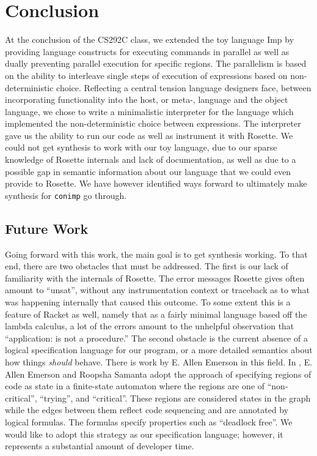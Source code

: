 \section{Conclusion}
At the conclusion of the CS292C class, we extended the toy language Imp by providing language constructs for executing commands in parallel as well as dually preventing parallel execution for specific regions.  The parallelism is based on the ability to interleave single steps of execution of expressions based on non-deterministic choice.  Reflecting a central tension language designers face, between incorporating functionality into the host, or meta-, language and the object language, we chose to write a minimalistic interpreter for the language which implemented the non-deterministic choice between expressions.  The interpreter gave us the ability to run our code as well as instrument it with Rosette.  We could not get synthesis to work with our toy language, due to our sparse knowledge of Rosette internals and lack of documentation, as well as due to a possible gap in semantic information about our language that we could even provide to Rosette.  We have however identified ways forward to ultimately make synthesis for \texttt{conimp} go through.

\subsection{Future Work}
Going forward with this work, the main goal is to get synthesis working.  To that end, there are two obstacles that must be addressed.  The first is our lack of familiarity with the internals of Rosette.  The error messages Rosette gives often amount to ``unsat'', without any instrumentation context or traceback as to what was happening internally that caused this outcome.  To some extent this is a feature of Racket as well, namely that as a fairly minimal language based off the lambda calculus, a lot of the errors amount to the unhelpful observation that ``application: is not a procedure.''  The second obstacle is the current absence of a logical specification language for our program, or a more detailed semantics about how things {\em should} behave.  There is work by E. Allen Emerson in this field.  In \cite{emerson2011}, E. Allen Emerson and Roopsha Samanta adopt the approach of specifying regions of code as state in a finite-state automaton where the regions are one of ``non-critical'', ``trying'', and ``critical''.  These regions are considered states in the graph while the edges between them reflect code sequencing and are annotated by logical formulas.  The formulas specify properties such as ``deadlock free''.  We would like to adopt this strategy as our specification language; however, it represents a substantial amount of developer time.

